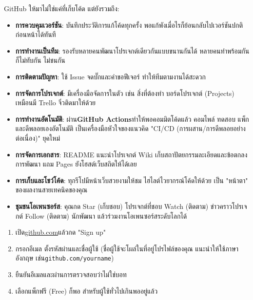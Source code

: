 GitHub ให้มาไม่ใช่แค่ที่เก็บโค้ด แต่ยังรวมถึง:

\begin{itemize}
  \item \textbf{การควบคุมเวอร์ชัน}: บันทึกประวัติการแก้โค้ดทุกครั้ง พอแก้พังเมื่อไรก็ย้อนกลับไปเวอร์ชันปกติก่อนหน้าได้ทันที
  \item \textbf{การทำงานเป็นทีม}: รองรับหลายคนพัฒนาโปรเจกต์เดียวกันแบบขนานกันได้ หลายคนทำพร้อมกันก็ไม่ทับกัน ไม่ชนกัน
  \item \textbf{การติดตามปัญหา}: ใช้ Issue จดบั๊กและคำขอฟีเจอร์ ทำให้ทีมตามงานได้สะดวก
  \item \textbf{การจัดการโปรเจกต์}: มีเครื่องมือจัดการในตัว เช่น สิ่งที่ต้องทำ บอร์ดโปรเจกต์ (Projects) เหมือนมี Trello จิ๋วติดมาให้ด้วย
  \item \textbf{การทำงานอัตโนมัติ}: ผ่าน\textbf{GitHub Actions}ทำให้พอคอมมิตโค้ดแล้ว คอมไพล์ ทดสอบ แพ็ก และดีพลอยเองอัตโนมัติ เป็นเครื่องมือหัวใจของแนวคิด "CI/CD (การผสาน/การดีพลอยอย่างต่อเนื่อง)" ยุคใหม่
  \item \textbf{การจัดการเอกสาร}: README แนะนำโปรเจกต์ Wiki เก็บสถาปัตยกรรมละเอียดและข้อตกลงการพัฒนา แถม Pages ยังโฮสต์เว็บสถิตให้ได้เลย
  \item \textbf{การเก็บและโชว์โค้ด}: ทุกรีโปมีหน้าเว็บสวยงามให้ชม ไฮไลต์ไวยากรณ์โค้ดให้ด้วย เป็น "หน้าตา" ของผลงานสายเทคนิคของคุณ
  \item \textbf{ชุมชนโอเพนซอร์ส}: คุณกด Star (เก็บชอบ) โปรเจกต์ที่ชอบ Watch (ติดตาม) ข่าวคราวโปรเจกต์ Follow (ติดตาม) นักพัฒนา แล้วร่วมงานโอเพนซอร์สระดับโลกได้
\end{itemize}



\begin{enumerate}
  \item เปิด\href{https://github.com}{github.com}แล้วกด "Sign up"
  \item กรอกอีเมล ตั้งรหัสผ่านและชื่อผู้ใช้ (ชื่อผู้ใช้จะโผล่ในที่อยู่โปรไฟล์ของคุณ แนะนำให้ใช้ภาษาอังกฤษ เช่น\texttt{github.\allowbreak com/\allowbreak yourname})
  \item ยืนยันอีเมลและผ่านการตรวจสอบว่าไม่ใช่บอท
  \item เลือกแพ็กฟรี (Free) ก็พอ สำหรับผู้ใช้ทั่วไปเกินพออยู่แล้ว
\end{enumerate}



